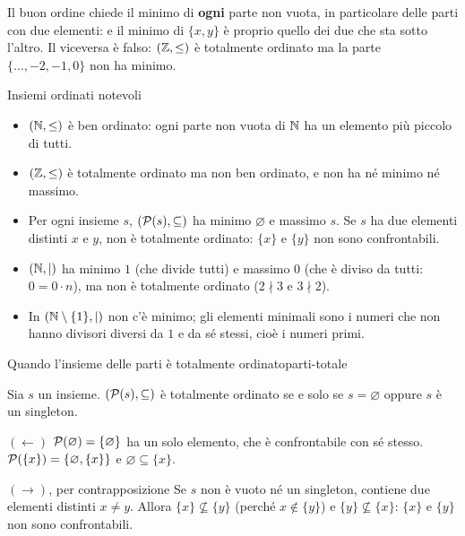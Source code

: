 \begin{spiegazione}
    Il buon ordine chiede il minimo di \textbf{ogni} parte non vuota, in particolare delle parti con due elementi: e il minimo di
    $\{x, y\}$ è proprio quello dei due che sta sotto l'altro. Il viceversa è falso: $(\mathbb{Z}, \leq)$ è totalmente ordinato ma la
    parte $\{\dots, -2, -1, 0\}$ non ha minimo.
\end{spiegazione}

\begin{esempio}{Insiemi ordinati notevoli}
    \begin{itemize}
        \item $(\mathbb{N}, \leq)$ è ben ordinato: ogni parte non vuota di $\mathbb{N}$ ha un elemento più piccolo di tutti.
        \item $(\mathbb{Z}, \leq)$ è totalmente ordinato ma non ben ordinato, e non ha né minimo né massimo.
        \item Per ogni insieme $s$, $(\mathcal{P}(s), \subseteq)$ ha minimo $\varnothing$ e massimo $s$. Se $s$ ha due elementi distinti $x$ e $y$,
              non è totalmente ordinato: $\{x\}$ e $\{y\}$ non sono confrontabili.
        \item $(\mathbb{N}, \mid)$ ha minimo $1$ (che divide tutti) e massimo $0$ (che è diviso da tutti: $0 = 0 \cdot n$), ma non è
              totalmente ordinato ($2 \nmid 3$ e $3 \nmid 2$).
        \item In $(\mathbb{N} \setminus \{1\}, \mid)$ non c'è minimo; gli elementi minimali sono i numeri che non hanno divisori
              diversi da $1$ e da sé stessi, cioè i numeri primi.
    \end{itemize}
\end{esempio}

\begin{concetto}
\begin{Proposizione}{Quando l'insieme delle parti è totalmente ordinato}{parti-totale}
    \begin{prerequisiti}
    \end{prerequisiti}
    Sia $s$ un insieme. $(\mathcal{P}(s), \subseteq)$ è totalmente ordinato se e solo se $s = \varnothing$ oppure $s$ è un singleton.
\end{Proposizione}
\begin{dimostrazione}
    \begin{caso}{$(\leftarrow)$}
        $\mathcal{P}(\varnothing) = \{\varnothing\}$ ha un solo elemento, che è confrontabile con sé stesso. $\mathcal{P}(\{x\}) = \{\varnothing, \{x\}\}$ e
        $\varnothing \subseteq \{x\}$.
    \end{caso}
    \begin{caso}{$(\rightarrow)$, per contrapposizione}
        Se $s$ non è vuoto né un singleton, contiene due elementi distinti $x \neq y$. Allora $\{x\} \not\subseteq \{y\}$ (perché
        $x \notin \{y\}$) e $\{y\} \not\subseteq \{x\}$: $\{x\}$ e $\{y\}$ non sono confrontabili.
    \end{caso}
\end{dimostrazione}
\end{concetto}

